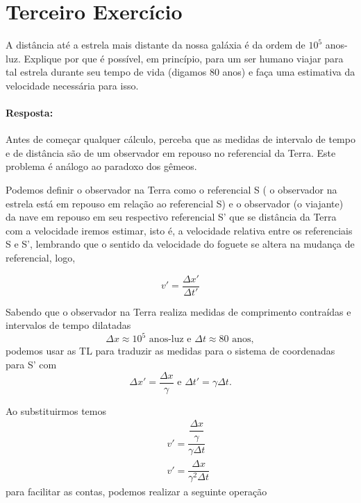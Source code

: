 \documentclass[10pt,a4paper]{article}
\author{Arthur de Souza Molina e Gabriel Capelini Magalhaes}
\begin{document}
	\section{Terceiro Exercício}
	A distância até a estrela mais distante da nossa galáxia é da ordem de $10^{5}$ anos-luz. Explique por que é possível, em princípio, para um ser humano viajar para tal estrela durante seu tempo de vida (digamos 80 anos) e faça uma estimativa da velocidade necessária para isso.
	\paragraph{Resposta:}
	Antes de começar qualquer cálculo, perceba que as medidas de intervalo de tempo e de distância são de um observador em repouso no referencial da Terra. Este problema é análogo ao paradoxo dos gêmeos.
	
	Podemos definir o observador na Terra como o referencial S ( o observador na estrela está em repouso em relação ao referencial S) e o observador (o viajante) da nave em repouso em seu respectivo referencial S' que se distância da Terra com a velocidade iremos estimar, isto é, a velocidade relativa entre os referenciais S e S', lembrando que o sentido da velocidade do foguete se altera na mudança de referencial, logo,
	
	\begin{equation}\label{v_foguete}
		  v' = \dfrac{\Delta x'}{\Delta t'}
	\end{equation}
	
	Sabendo que o observador na Terra realiza medidas de comprimento contraídas e intervalos de tempo dilatadas
	\begin{equation}
		\Delta x \approx 10^5 \text{  anos-luz    e  } \Delta t \approx \text{80 anos},
	\end{equation}
	podemos usar as TL para traduzir as medidas para o sistema de coordenadas para S' com
	\begin{equation}\label{TL_repouso}
		\Delta x' = \dfrac{\Delta x}{\gamma}\text{  e  } \Delta t' = \gamma\Delta t.
	\end{equation}

	Ao substituirmos temos
	\begin{eqnarray}
		&& v' = \dfrac{\dfrac{\Delta x}{\gamma}}{\gamma\Delta t} \nonumber \\
		&& v' = \dfrac{\Delta x}{\gamma^2\Delta t}\nonumber
	\end{eqnarray}
	para facilitar as contas, podemos realizar a seguinte operação
	
\end{document}
